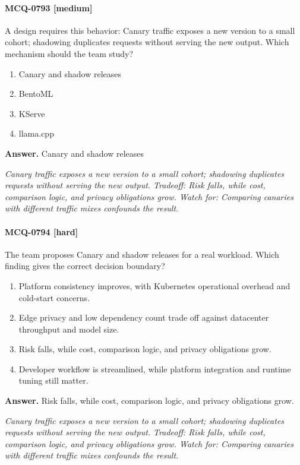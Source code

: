 \paragraph{MCQ-0793 [medium]} A design requires this behavior: Canary traffic exposes a new version to a small cohort; shadowing duplicates requests without serving the new output. Which mechanism should the team study?
\begin{enumerate}[label=\Alph*.]
\item Canary and shadow releases
\item BentoML
\item KServe
\item llama.cpp
\end{enumerate}
\noindent\textbf{Answer.} Canary and shadow releases
\par\textit{Canary traffic exposes a new version to a small cohort; shadowing duplicates requests without serving the new output. Tradeoff: Risk falls, while cost, comparison logic, and privacy obligations grow. Watch for: Comparing canaries with different traffic mixes confounds the result.}
\paragraph{MCQ-0794 [hard]} The team proposes Canary and shadow releases for a real workload. Which finding gives the correct decision boundary?
\begin{enumerate}[label=\Alph*.]
\item Platform consistency improves, with Kubernetes operational overhead and cold-start concerns.
\item Edge privacy and low dependency count trade off against datacenter throughput and model size.
\item Risk falls, while cost, comparison logic, and privacy obligations grow.
\item Developer workflow is streamlined, while platform integration and runtime tuning still matter.
\end{enumerate}
\noindent\textbf{Answer.} Risk falls, while cost, comparison logic, and privacy obligations grow.
\par\textit{Canary traffic exposes a new version to a small cohort; shadowing duplicates requests without serving the new output. Tradeoff: Risk falls, while cost, comparison logic, and privacy obligations grow. Watch for: Comparing canaries with different traffic mixes confounds the result.}
